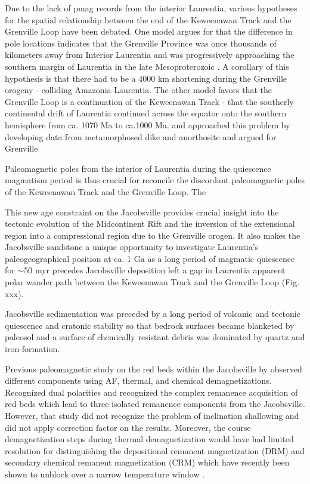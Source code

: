\documentclass[11pt,letterpaper]{article}
\begin{document}
Due to the lack of pmag records from the interior Laurentia, various hypotheses for the spatial relationship between the end of the Keweenawan Track and the Grenville Loop have been debated. One model argues for that the difference in pole locations indicates that the Grenville Province was once thousands of kilometers away from Interior Laurentia and was progressively approaching the southern margin of Laurentia in the late Mesoproterozoic \citep{Halls2015}. A corollary of this hypothesis is that there had to be a 4000 km shortening during the Grenville orogeny - colliding Amazonia-Laurentia. The other model favors that the Grenville Loop is a continuation of the Keweenawan Track - that the southerly continental drift of Laurentia continued across the equator onto the southern hemisphere from ca. 1070 Ma to ca.1000 Ma. and  approached this problem by developing data from metamorphosed dike and anorthosite and argued for Grenville  

Paleomagnetic poles from the interior of Laurentia during the quiescence magmatism period is thus crucial for reconcile the discordant paleomagnetic poles of the Keweenawan Track and the Grenville Loop. The

This new age constraint on the Jacobsville provides crucial insight into the tectonic evolution of the Midcontinent Rift and the inversion of the extensional region into a compressional region due to the Grenville orogen. It also makes the Jacobsville sandstone a unique opportunity to investigate Laurentia's paleogeographical position at ca. 1 Ga as a long period of magmatic quiescence for $\sim$50 myr precedes Jacobsville deposition left a gap in Laurentia apparent polar wander path between the Keweenawan Track and the Grenville Loop (Fig. xxx). 

Jacobsville sedimentation was preceded by a long period of volcanic and tectonic quiescence and cratonic stability so that bedrock surfaces became blanketed by paleosol and a surface of chemically resistant debris was dominated by quartz and iron-formation. 

Previous paleomagnetic study on the red beds within the Jacobsville by \cite{Roy1978a} observed different components using AF, thermal, and chemical demagnetizations. Recognized dual polarities and recognized the complex remanence acquisition of red beds which lead to three isolated remanence components from the Jacobsville. However, that study did not recognize the problem of inclination shallowing and did not apply correction factor on the results. Moreover, the course demagnetization steps during thermal demagnetization would have had limited resolution for distinguishing the depositional remanent magnetization (DRM) and secondary chemical remanent magnetization (CRM) which have recently been shown to unblock over a narrow temperature window \cite{Swanson-Hysell2019b}. 
\end{document}

